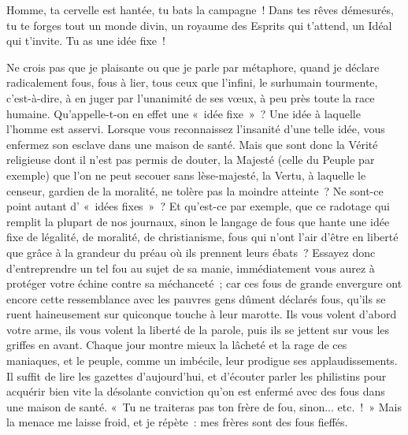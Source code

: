 \documentclass[french,twoside]{book} %
\begin{document}
\noindent Homme, ta cervelle est hantée, tu bats la campagne ! Dans tes rêves démesurés, tu te forges tout un monde divin, un royaume des Esprits qui t’attend, un Idéal qui t’invite. Tu as une idée fixe !\par
Ne crois pas que je plaisante ou que je parle par métaphore, quand je déclare radicalement fous, fous à lier, tous ceux que l’infini, le surhumain tourmente, c’est-à-dire, à en juger par l’unanimité de ses vœux, à peu près toute la race humaine. Qu’appelle-t-on en effet une « idée fixe » ? Une idée à laquelle l’homme est asservi. Lorsque vous reconnaissez l’insanité d’une telle idée, vous enfermez son esclave dans une maison de santé. Mais que sont donc la Vérité religieuse dont il n’est pas permis de douter, la Majesté (celle du Peuple par exemple) que l’on ne peut secouer sans lèse-majesté, la Vertu, à laquelle le censeur, gardien de la moralité, ne tolère pas la moindre atteinte ? Ne sont-ce point autant d’ « idées fixes » ? Et qu’est-ce par exemple, que ce radotage qui remplit la plupart de nos journaux, sinon le langage de fous que hante une idée fixe de légalité, de moralité, de christianisme, fous qui n’ont l’air d’être en liberté que grâce à la grandeur du préau où ils prennent leurs ébats ? Essayez donc d’entreprendre un tel fou au sujet de sa manie, immédiatement vous aurez à protéger votre échine contre sa méchanceté ; car ces fous de grande envergure ont encore cette ressemblance avec les pauvres gens dûment déclarés fous, qu’ils se ruent haineusement sur quiconque touche à leur marotte. Ils vous volent d’abord votre arme, ils vous volent la liberté de la parole, puis ils se jettent sur vous les griffes en avant. Chaque jour montre mieux la lâcheté et la rage de ces maniaques, et le peuple, comme  un imbécile, leur prodigue ses applaudissements. Il suffit de lire les gazettes d’aujourd’hui, et d’écouter parler les philistins pour acquérir bien vite la désolante conviction qu’on est enfermé avec des fous dans une maison de santé. « Tu ne traiteras pas ton frère de fou, sinon... etc. ! » Mais la menace me laisse froid, et je répète : mes frères sont des fous fieffés.\par
\end{document}
